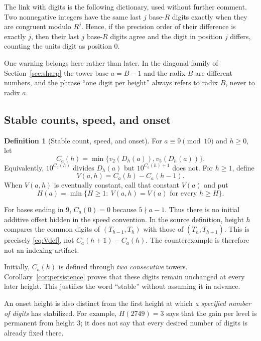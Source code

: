 \documentclass[11pt,letterpaper]{article}
\numberwithin{equation}{section}
\theoremstyle{definition}
\newtheorem{definition}[theorem]{Definition}
\theoremstyle{remark}
\begin{document}
The link with digits is the following dictionary, used without further comment. Two nonnegative integers have the same last $j$ base-$R$ digits exactly when they are congruent modulo $R^j$. Hence, if the precision order of their difference is exactly $j$, then their last $j$ base-$R$ digits agree and the digit in position $j$ differs, counting the units digit as position $0$.

One warning belongs here rather than later. In the diagonal family of Section~\ref{sec:sharp} the tower base $a=B-1$ and the radix $B$ are different numbers, and the phrase ``one digit per height'' always refers to radix $B$, never to radix $a$.

\subsection{Stable counts, speed, and onset}\label{sec:counts}

\begin{definition}[Stable count, speed, and onset]\label{def:counts}
For $a\equiv9\pmod{10}$ and $h\ge0$, let
\begin{equation}\label{eq:Cdef}
 C_a(h)=\min\{v_2(D_h(a)),v_5(D_h(a))\}.
\end{equation}
Equivalently, $10^{C_a(h)}$ divides $D_h(a)$ but $10^{C_a(h)+1}$ does not. For $h\ge1$, define
\begin{equation}\label{eq:Vdef}
 V(a,h)=C_a(h)-C_a(h-1).
\end{equation}
When $V(a,h)$ is eventually constant, call that constant $V(a)$ and put
\begin{equation}\label{eq:Hdef}
 H(a)=\min\{H\ge1:\ V(a,h)=V(a)\text{ for every }h\ge H\}.
\end{equation}
\end{definition}

For bases ending in 9, $C_a(0)=0$ because $5\nmid a-1$. Thus there is no initial additive offset hidden in the speed convention. In the source definition, height $h$ compares the common digits of $(T_{h-1},T_h)$ with those of $(T_h,T_{h+1})$. This is precisely \eqref{eq:Vdef}, not $C_a(h+1)-C_a(h)$. The counterexample is therefore not an indexing artifact.

Initially, $C_a(h)$ is defined through \emph{two consecutive} towers. Corollary~\ref{cor:persistence} proves that these digits remain unchanged at every later height. This justifies the word ``stable'' without assuming it in advance.

An onset height is also distinct from the first height at which \emph{a specified number of digits} has stabilized. For example, $H(2749)=3$ says that the gain per level is permanent from height 3; it does not say that every desired number of digits is already fixed there.
\end{document}
